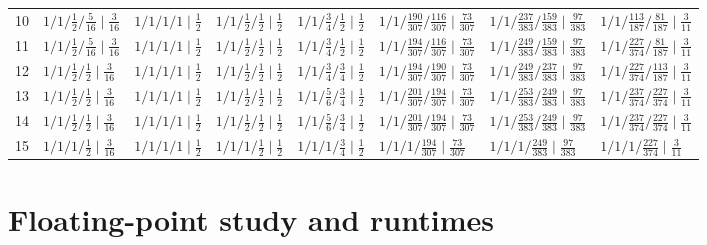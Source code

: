 \documentclass[11pt,a4paper]{article}
\theoremstyle{plain}
\theoremstyle{definition}
\theoremstyle{remark}
\begin{document}
\begin{table}[H]
{\begin{tabular}{rlllllll}
10 & $1/1/\tfrac{1}{2}/\tfrac{5}{16} \mid \tfrac{3}{16}$ & $1/1/1/1 \mid \tfrac{1}{2}$ & $1/1/\tfrac{1}{2}/\tfrac{1}{2} \mid \tfrac{1}{2}$ & $1/1/\tfrac{3}{4}/\tfrac{1}{2} \mid \tfrac{1}{2}$ & $1/1/\tfrac{190}{307}/\tfrac{116}{307} \mid \tfrac{73}{307}$ & $1/1/\tfrac{237}{383}/\tfrac{159}{383} \mid \tfrac{97}{383}$ & $1/1/\tfrac{113}{187}/\tfrac{81}{187} \mid \tfrac{3}{11}$\\
11 & $1/1/\tfrac{1}{2}/\tfrac{5}{16} \mid \tfrac{3}{16}$ & $1/1/1/1 \mid \tfrac{1}{2}$ & $1/1/\tfrac{1}{2}/\tfrac{1}{2} \mid \tfrac{1}{2}$ & $1/1/\tfrac{3}{4}/\tfrac{1}{2} \mid \tfrac{1}{2}$ & $1/1/\tfrac{194}{307}/\tfrac{116}{307} \mid \tfrac{73}{307}$ & $1/1/\tfrac{249}{383}/\tfrac{159}{383} \mid \tfrac{97}{383}$ & $1/1/\tfrac{227}{374}/\tfrac{81}{187} \mid \tfrac{3}{11}$\\
12 & $1/1/\tfrac{1}{2}/\tfrac{1}{2} \mid \tfrac{3}{16}$ & $1/1/1/1 \mid \tfrac{1}{2}$ & $1/1/\tfrac{1}{2}/\tfrac{1}{2} \mid \tfrac{1}{2}$ & $1/1/\tfrac{3}{4}/\tfrac{3}{4} \mid \tfrac{1}{2}$ & $1/1/\tfrac{194}{307}/\tfrac{190}{307} \mid \tfrac{73}{307}$ & $1/1/\tfrac{249}{383}/\tfrac{237}{383} \mid \tfrac{97}{383}$ & $1/1/\tfrac{227}{374}/\tfrac{113}{187} \mid \tfrac{3}{11}$\\
13 & $1/1/\tfrac{1}{2}/\tfrac{1}{2} \mid \tfrac{3}{16}$ & $1/1/1/1 \mid \tfrac{1}{2}$ & $1/1/\tfrac{1}{2}/\tfrac{1}{2} \mid \tfrac{1}{2}$ & $1/1/\tfrac{5}{6}/\tfrac{3}{4} \mid \tfrac{1}{2}$ & $1/1/\tfrac{201}{307}/\tfrac{194}{307} \mid \tfrac{73}{307}$ & $1/1/\tfrac{253}{383}/\tfrac{249}{383} \mid \tfrac{97}{383}$ & $1/1/\tfrac{237}{374}/\tfrac{227}{374} \mid \tfrac{3}{11}$\\
14 & $1/1/\tfrac{1}{2}/\tfrac{1}{2} \mid \tfrac{3}{16}$ & $1/1/1/1 \mid \tfrac{1}{2}$ & $1/1/\tfrac{1}{2}/\tfrac{1}{2} \mid \tfrac{1}{2}$ & $1/1/\tfrac{5}{6}/\tfrac{3}{4} \mid \tfrac{1}{2}$ & $1/1/\tfrac{201}{307}/\tfrac{194}{307} \mid \tfrac{73}{307}$ & $1/1/\tfrac{253}{383}/\tfrac{249}{383} \mid \tfrac{97}{383}$ & $1/1/\tfrac{237}{374}/\tfrac{227}{374} \mid \tfrac{3}{11}$\\
15 & $1/1/1/\tfrac{1}{2} \mid \tfrac{3}{16}$ & $1/1/1/1 \mid \tfrac{1}{2}$ & $1/1/1/\tfrac{1}{2} \mid \tfrac{1}{2}$ & $1/1/1/\tfrac{3}{4} \mid \tfrac{1}{2}$ & $1/1/1/\tfrac{194}{307} \mid \tfrac{73}{307}$ & $1/1/1/\tfrac{249}{383} \mid \tfrac{97}{383}$ & $1/1/1/\tfrac{227}{374} \mid \tfrac{3}{11}$\\
\bottomrule
\end{tabular}}
\end{table}
\section{Floating-point study and runtimes}\label{S:float}
\end{document}
